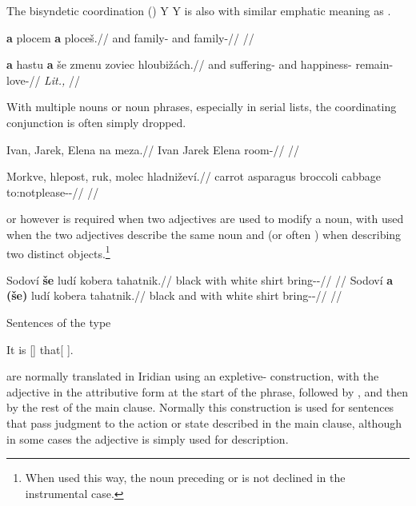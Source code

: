 The bisyndetic coordination (\cite{velupillai2012})  Y  Y is also with similar emphatic meaning as .

\pex
\begingl
    \gla \textbf{a} plocem \textbf{a} ploceš.//
    \glb and family-\First{}\Sg{} and family-//
    \glft {}//
\endgl
\xe

\pex
\begingl
    \gla \textbf{a} hastu \textbf{a} še zmenu zoviec hloubižách.//
    \glb and suffering-\mk{} and \Com{} happiness-\Ins{} remain-\Cv{} love-//
    \glft {} \emph{Lit.,} //
\endgl
\xe

With multiple nouns or noun phrases, especially in serial lists, the coordinating conjunction is often simply dropped.

\pex
\begingl
    \gla Ivan, Jarek, Elena na meza.//
    \glb Ivan Jarek Elena \Loc{} room-\Pat{}//
    \glft {}//
\endgl
\xe

\pex
\begingl
    \gla Morkve, hlepost, ruk, molec hladniževí.//
    \glb carrot asparagus broccoli cabbage to:notplease-\Av{}-\Cont{}//
    \glft {}//
\endgl
\xe

 or  however is required when two adjectives are used to modify a noun, with  used when the two adjectives describe the same noun and  (or often ) when describing two distinct objects.\footnote{When used this way, the noun preceding  or  is not declined in the instrumental case.}

\pex
\a
\begingl
    \gla Sodoví \textbf{še} ludí kobera tahatnik.//
    \glb black with white shirt bring-\Pv{}-\Pf{}//
    \glft {}//
\endgl
\a
\begingl
    \gla Sodoví \textbf{a} \textbf{(še)} ludí kobera tahatnik.//
    \glb black and with white shirt bring-\Pv{}-\Pf{}//
    \glft {}//
\endgl
\xe

Sentences of the type

\ex
It is [] that[ ].
\xe

are normally translated in Iridian using an expletive- construction, with the adjective in the attributive form at the start of the phrase, followed by , and then by the rest of the main clause. Normally this construction is used for sentences that pass judgment to the action or state described in the main clause, although in some cases the adjective is simply used for description.

